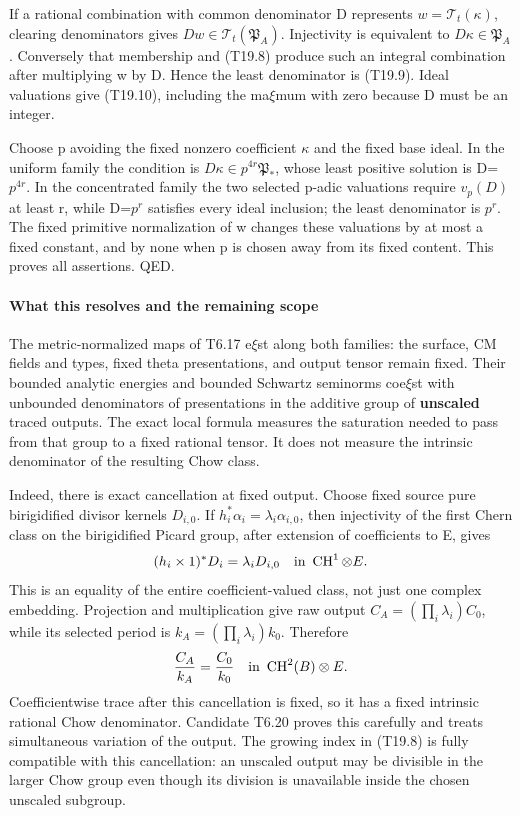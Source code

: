 \documentclass[11pt,a4paper]{article}
\theoremstyle{definition}
\begin{document}
If a rational combination with common denominator D represents \(w=\mathcal T_t(\kappa)\), clearing denominators gives \(Dw\in\mathcal T_t(\mathfrak P_A)\). Injectivity is equivalent to \(D\kappa\in\mathfrak P_A\). Conversely that membership and (T19.8) produce such an integral combination after multiplying w by D. Hence the least denominator is (T19.9). Ideal valuations give (T19.10), including the ma\(\xi\)mum with zero because D must be an integer.

Choose p avoiding the fixed nonzero coefficient \(\kappa\) and the fixed base ideal. In the uniform family the condition is \(D\kappa\in p^{4r}\mathfrak P_*\), whose least positive solution is D=\(p^{4r}\). In the concentrated family the two selected p-adic valuations require \(v_p(D)\) at least r, while D=\(p^r\) satisfies every ideal inclusion; the least denominator is \(p^r\). The fixed primitive normalization of w changes these valuations by at most a fixed constant, and by none when p is chosen away from its fixed content. This proves all assertions. QED.

\paragraph{What this resolves and the remaining scope}\label{what-this-resolves-and-the-remaining-scope}

The metric-normalized maps of T6.17 e\(\xi\)st along both families: the surface, CM fields and types, fixed theta presentations, and output tensor remain fixed. Their bounded analytic energies and bounded Schwartz seminorms coe\(\xi\)st with unbounded denominators of presentations in the additive group of \textbf{unscaled} traced outputs. The exact local formula measures the saturation needed to pass from that group to a fixed rational tensor. It does not measure the intrinsic denominator of the resulting Chow class.

Indeed, there is exact cancellation at fixed output. Choose fixed source pure birigidified divisor kernels \(D_{i,0}\). If \(h_i^*\alpha_i=\lambda_i\alpha_{i,0}\), then injectivity of the first Chern class on the birigidified Picard group, after extension of coefficients to E, gives \[
 (h_i\times1)^*D_i=\lambda_iD_{i,0}
 \quad\hbox{in }\operatorname{CH}^1\otimes E.
\] This is an equality of the entire coefficient-valued class, not just one complex embedding. Projection and multiplication give raw output \(C_A=(\prod_i\lambda_i)C_0\), while its selected period is \(k_A=(\prod_i\lambda_i)k_0\). Therefore \[
 \frac{C_A}{k_A}=\frac{C_0}{k_0}
 \quad\hbox{in }\operatorname{CH}^2(B)\otimes E.
\] Coefficientwise trace after this cancellation is fixed, so it has a fixed intrinsic rational Chow denominator. Candidate T6.20 proves this carefully and treats simultaneous variation of the output. The growing index in (T19.8) is fully compatible with this cancellation: an unscaled output may be divisible in the larger Chow group even though its division is unavailable inside the chosen unscaled subgroup.
\end{document}

